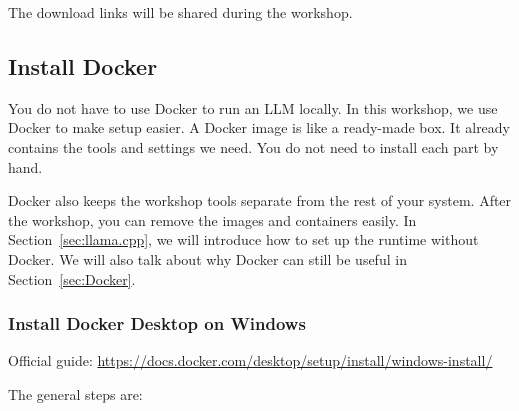 \documentclass[a4paper,12pt]{article}
\begin{document}
The download links will be shared during the workshop.

\subsection{Install Docker}

You do not have to use Docker to run an LLM locally. In this workshop, we use Docker to make setup easier. A Docker image is like a ready-made box. It already contains the tools and settings we need. You do not need to install each part by hand.

Docker also keeps the workshop tools separate from the rest of your system. After the workshop, you can remove the images and containers easily. In Section~\ref{sec:llama.cpp}, we will introduce how to set up the runtime without Docker. We will also talk about why Docker can still be useful in Section~\ref{sec:Docker}.

\subsubsection{Install Docker Desktop on Windows}

Official guide: \url{https://docs.docker.com/desktop/setup/install/windows-install/}

The general steps are:
\end{document}
